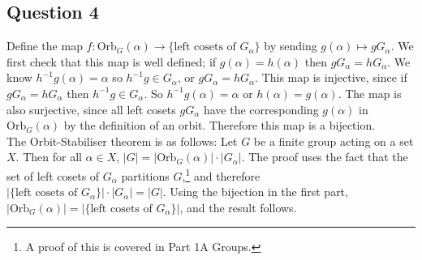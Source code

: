 \documentclass[10pt,a4paper,notitlepage]{article}
\newcommand{\abs}[1]{\lvert#1\rvert}
\newcommand{\Orb}{\text{Orb}}
\begin{document}
\subsection*{\centering Question 4}
Define the map $f: \Orb_{G}(\alpha) \rightarrow \lbrace \text{left cosets of } G_{\alpha}\rbrace$ by sending $g(\alpha) \mapsto gG_{\alpha}$. We first check that this map is well defined; if $g\left(\alpha\right)=h\left(\alpha\right)$ then $gG_{\alpha}=hG_{\alpha}$. We know $h^{-1}g(\alpha)=\alpha$ so $h^{-1}g\in G_{\alpha}$, or $gG_{\alpha}=hG_{\alpha}$. This map is injective, since if $gG_{\alpha}=hG_{\alpha}$ then $h^{-1}g\in G_{\alpha}$. So $h^{-1}g(\alpha)=\alpha$ or $h(\alpha)=g(\alpha)$. The map is also surjective, since all left cosets $gG_{\alpha}$ have the corresponding $g(\alpha)$ in $\Orb_{G}\left(\alpha\right)$ by the definition of an orbit. Therefore this map is a bijection. \\

The Orbit-Stabiliser theorem is as follows: Let $G$ be a finite group acting on a set $X$. Then for all $\alpha\in X$, $\abs{G}=\abs{\Orb_{G}\left(\alpha\right)} \cdot \abs{G_{\alpha}}$. The proof uses the fact that the set of left cosets of $G_{\alpha}$ partitions $G$,\footnote{A proof of this is covered in Part 1A Groups.} and therefore $\abs{\lbrace \text{left cosets of }G_{\alpha}\rbrace}\cdot \abs{G_{\alpha}}=\abs{G}$. Using the bijection in the first part, $\abs{\Orb_{G}\left(\alpha\right)}=\abs{\lbrace \text{left cosets of } G_{\alpha}\rbrace}$, and the result follows. 
\end{document}
